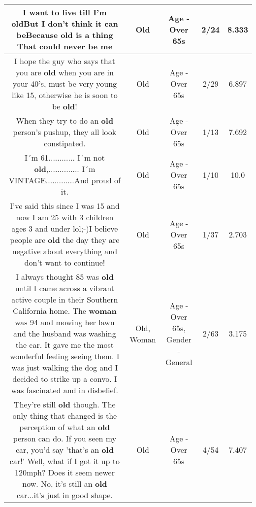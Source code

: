 \documentclass[11pt]{article}
\newlength\mylength
\begin{document}
\begin{center}
\begin{longtable}{|C{.65\mylength}|C{.30\mylength}|C{.12\mylength}|C{.12\mylength}|C{.12\mylength}|}
  \small I want to live till I'm \textbf{old}But I don't think it can beBecause \textbf{old} is a thing That could never be me\normalsize   & Old & Age - Over 65s & 2/24 & 8.333 \\  \hline
  \small I hope the guy who says that you are \textbf{old} when you are in your 40's, must be very young like 15, otherwise he is soon to be \textbf{old}!\normalsize   & Old & Age - Over 65s & 2/29 & 6.897 \\  \hline
  \small When they try to do an \textbf{old} person's pushup, they all look constipated.\normalsize   & Old & Age - Over 65s & 1/13 & 7.692 \\  \hline
  \small I´m 61............ I´m not \textbf{old},.............. I´m VINTAGE.............And proud of it.\normalsize   & Old & Age - Over 65s & 1/10 & 10.0 \\  \hline
  \small I've said this since I was 15 and now I am 25 with 3 children ages 3 and under lol;-)I believe people are \textbf{old} the day they are negative about everything and don't want to continue!\normalsize   & Old & Age - Over 65s & 1/37 & 2.703 \\  \hline
  \small I always thought 85 was \textbf{old} until I came across a vibrant active couple in their Southern California home. The \textbf{woman} was 94 and mowing her lawn and the husband was washing the car. It gave me the most wonderful feeling seeing them. I was just walking the dog and I decided to strike up a convo. I was fascinated and in disbelief.\normalsize   & Old, Woman & Age - Over 65s, Gender - General & 2/63 & 3.175 \\  \hline
  \small They're still \textbf{old} though. The only thing that changed is the perception of what an \textbf{old} person can do. If you seen my car, you'd say 'that's an \textbf{old} car!' Well, what if I got it up to 120mph? Does it seem newer now. No, it's still an \textbf{old} car...it's just in good shape.\normalsize   & Old & Age - Over 65s & 4/54 & 7.407 \\  \hline

\end{longtable}
\end{center}
\end{document}
